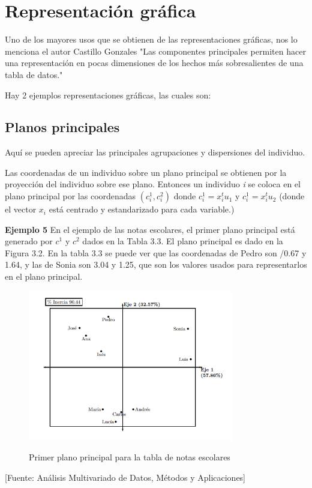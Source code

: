 \section{Representación gráfica}
 Uno de los mayores usos que se obtienen de las representaciones gráficas, nos lo menciona el autor Castillo Gonzales "Las componentes principales permiten hacer una representación en pocas dimensiones de los hechos más sobresalientes de una tabla de datos." \cite{CastilloGonzalez}
 
 Hay 2 ejemplos representaciones gráficas, las cuales son:
 
 \subsection{Planos principales}
 Aquí se pueden apreciar las principales agrupaciones y dispersiones del individuo.
 
 Las coordenadas de un individuo sobre un plano principal se obtienen por la proyección del individuo sobre ese plano. Entonces un individuo \textit{i} se coloca en el plano principal por las coordenadas $(c_{\textit{i}}^{1},c_{\textit{i}}^{2})$ donde $c_{\textit{i}}^{1} = x_{\textit{i}}^{t}u_{1}$ y $c_{\textit{i}}^{1} = x_{\textit{i}}^{t}u_{2}$ (donde el vector $x_{\textit{i}}$ está centrado y estandarizado para cada variable.) 
 
 \textbf{Ejemplo 5} En el ejemplo de las notas escolares, el primer plano principal está generado por $c^{1}$ y $c^{2}$ dados en la Tabla 3.3. El plano principal es dado en la Figura 3.2. En la tabla 3.3 se puede ver que las coordenadas de Pedro son /0.67 y 1.64, y las de Sonia son 3.04 y 1.25, que son los valores usados para representarlos en el plano principal.
 
 \begin{figure}[H]
        \centering
        \caption{Primer plano principal para la tabla de notas escolares}
        \includegraphics[width=0.8\textwidth]{figures/plano.png}
        \label{ejemplo5}
\end{figure}
\begin{center}
    [Fuente:  Análisis Multivariado de Datos, Métodos y Aplicaciones]\cite{CastilloGonzalez}
\end{center}

